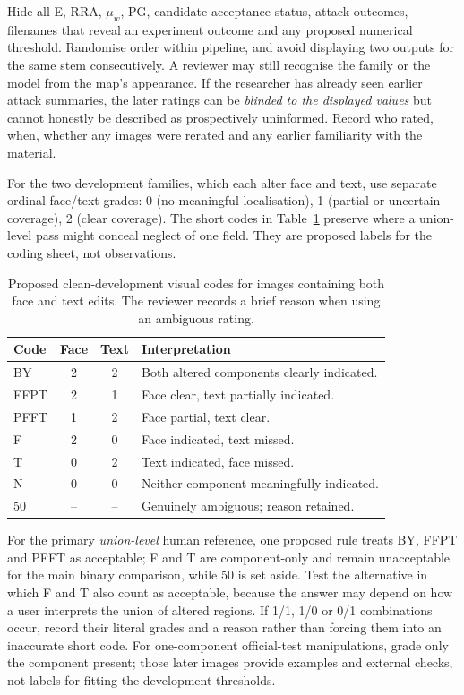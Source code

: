 Hide all E, RRA, $\mu_w$, PG, candidate acceptance status, attack outcomes, filenames that reveal an experiment outcome and any proposed numerical threshold. Randomise order within pipeline, and avoid displaying two outputs for the same stem consecutively. A reviewer may still recognise the family or the model from the map's appearance. If the researcher has already seen earlier attack summaries, the later ratings can be \emph{blinded to the displayed values} but cannot honestly be described as prospectively uninformed. Record who rated, when, whether any images were rerated and any earlier familiarity with the material.

For the two development families, which each alter face and text, use separate ordinal face/text grades: 0 (no meaningful localisation), 1 (partial or uncertain coverage), 2 (clear coverage). The short codes in Table~\ref{tab:app-clean-reviewcodes} preserve where a union-level pass might conceal neglect of one field. They are proposed labels for the coding sheet, not observations.

\begin{table}[htbp]
\centering\small
\caption{Proposed clean-development visual codes for images containing both face and text edits. The reviewer records a brief reason when using an ambiguous rating.}
\label{tab:app-clean-reviewcodes}
\begin{tabular}{@{}lccp{}@{}}
\toprule
Code & Face & Text & Interpretation \\
\midrule
BY & 2 & 2 & Both altered components clearly indicated. \\
FFPT & 2 & 1 & Face clear, text partially indicated. \\
PFFT & 1 & 2 & Face partial, text clear. \\
F & 2 & 0 & Face indicated, text missed. \\
T & 0 & 2 & Text indicated, face missed. \\
N & 0 & 0 & Neither component meaningfully indicated. \\
50 & -- & -- & Genuinely ambiguous; reason retained. \\
\bottomrule
\end{tabular}
\end{table}

For the primary \emph{union-level} human reference, one proposed rule treats BY, FFPT and PFFT as acceptable; F and T are component-only and remain unacceptable for the main binary comparison, while 50 is set aside. Test the alternative in which F and T also count as acceptable, because the answer may depend on how a user interprets the union of altered regions. If 1/1, 1/0 or 0/1 combinations occur, record their literal grades and a reason rather than forcing them into an inaccurate short code. For one-component official-test manipulations, grade only the component present; those later images provide examples and external checks, not labels for fitting the development thresholds.

